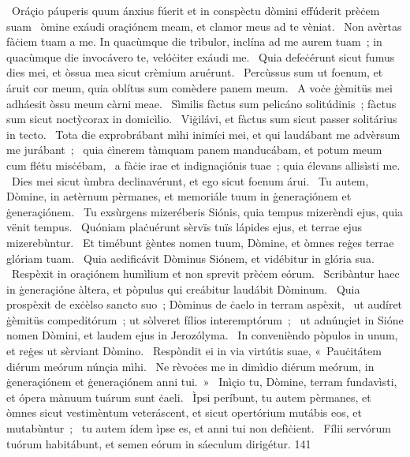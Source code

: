 {~Oráçio páuperis quum ánxius fúerit et in conspèctu dòmini effúderit prèċem suam}
{%
~òmine exáudi oraçiónem meam, et clamor meus ad te vèniat.
~Non avèrtas fàċiem tuam a me. In quacùmque die trìbulor, inclína ad me aurem tuam~; in quacùmque die invocávero te, velóċiter exáudi me.
~Quia defeċérunt sicut fumus dies mei, et òssua mea sicut crèmium aruérunt.
~Percùssus sum ut foenum, et áruit cor meum, quia oblítus sum comèdere panem meum.
~A voċe ġèmitüs mei adháesit òssu meum càrni meae.
~Sìmilis fàctus sum pelicáno solitúdinis~; fàctus sum sicut noctỳcorax in domicìlio.
~Viġilávi, et fàctus sum sicut passer solitárius in tecto.
~Tota die exprobrábant mìhi inimíci mei, et qui laudábant me advèrsum me jurábant~;
~quia ċìnerem tàmquam panem manducábam, et potum meum cum flétu misċébam,
~a fàċie irae et indignaçiónis tuae~; quia élevans allisìsti me.
~Dies mei sicut ùmbra declinavérunt, et ego sicut foenum árui.
~Tu autem, Dòmine, in aetèrnum pèrmanes, et memoriále tuum in ġeneraçiónem et ġeneraçiónem.
~Tu exsùrgens mizeréberis Siónis, quia tempus mizerèndi ejus, quia vënit tempus.
~Quóniam plaċuérunt sèrvïs tuïs lápides ejus, et terrae ejus mizerebùntur.
~Et timébunt ġèntes nomen tuum, Dòmine, et òmnes reġes terrae glóriam tuam.
~Quia aedificávit Dòminus Siónem, et vidébitur in glória sua.
~Respèxit in oraçiónem humìlium et non sprevit prèċem eórum.
~Scribàntur haec in ġeneraçióne àltera, et pòpulus qui creábitur laudábit Dòminum.
~Quia prospèxit de exċèlso sancto suo~; Dòminus de ċaelo in terram aspèxit,
~ut audíret ġèmitüs compeditórum~; ut sòlveret fílios interemptórum~;
~ut adnúnçiet in Sióne nomen Dòmini, et laudem ejus in Jerozólyma.
~In convenièndo pòpulos in unum, et reġes ut sèrviant Dòmino.
~Respòndit ei in via virtútis suae, «~Pauċitátem diérum meórum núnçia mìhi.
~Ne rèvoċes me in dimìdio diérum meórum, in ġeneraçiónem et ġeneraçiónem anni tui.~»
~Inìçio tu, Dòmine, terram fundavìsti, et ópera mànuum tuárum sunt ċaeli.
~Ìpsi períbunt, tu autem pèrmanes, et òmnes sicut vestimèntum veteráscent, et sicut opertórium mutábis eos, et mutabùntur~;
~tu autem ídem ìpse es, et anni tui non defìċient.
~Fílii servórum tuórum habitábunt, et semen eórum in sáeculum dirigétur.}
{14}{1}

